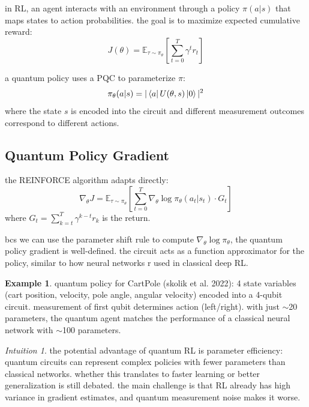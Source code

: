 \documentclass[11pt,a4paper]{article}
\theoremstyle{definition}
\newtheorem{example}{Example}[section]
\theoremstyle{remark}
\newtheorem*{intuition}{Intuition}
\begin{document}
in RL, an agent interacts with an environment through a policy $\pi(a|s)$ that maps states to action probabilities. the goal is to maximize expected cumulative reward:
\begin{equation}
    J(\theta) = \mathbb{E}_{\tau \sim \pi_\theta}\left[\sum_{t=0}^{T} \gamma^t r_t\right]
\end{equation}

a quantum policy uses a PQC to parameterize $\pi$:
\begin{equation}
    \pi_\theta(a|s) = |\bra{a} U(\theta, s) \ket{0}|^2
\end{equation}
where the state $s$ is encoded into the circuit and different measurement outcomes correspond to different actions.

\subsection{Quantum Policy Gradient}

the REINFORCE algorithm adapts directly:
\begin{equation}
    \nabla_\theta J = \mathbb{E}_{\tau \sim \pi_\theta}\left[\sum_{t=0}^{T} \nabla_\theta \log \pi_\theta(a_t | s_t) \cdot G_t\right]
\end{equation}
where $G_t = \sum_{k=t}^{T} \gamma^{k-t} r_k$ is the return.

bcs we can use the parameter shift rule to compute $\nabla_\theta \log \pi_\theta$, the quantum policy gradient is well-defined. the circuit acts as a function approximator for the policy, similar to how neural networks r used in classical deep RL.

\begin{example}
quantum policy for CartPole (skolik et al. 2022): 4 state variables (cart position, velocity, pole angle, angular velocity) encoded into a 4-qubit circuit. measurement of first qubit determines action (left/right). with just $\sim$20 parameters, the quantum agent matches the performance of a classical neural network with $\sim$100 parameters.
\end{example}

\begin{intuition}
the potential advantage of quantum RL is parameter efficiency: quantum circuits can represent complex policies with fewer parameters than classical networks. whether this translates to faster learning or better generalization is still debated. the main challenge is that RL already has high variance in gradient estimates, and quantum measurement noise makes it worse.
\end{intuition}
\end{document}
